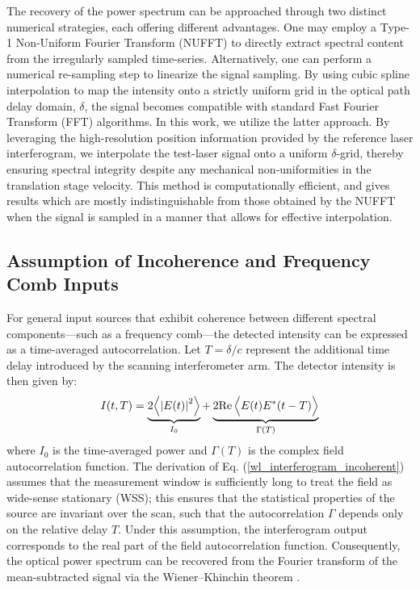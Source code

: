 \documentclass[12pt]{report}
\begin{document}
	The recovery of the power spectrum can be approached through two distinct numerical strategies, each offering different advantages. One may employ a Type-1 Non-Uniform Fourier Transform (NUFFT) to directly extract spectral content from the irregularly sampled time-series. Alternatively, one can perform a numerical re-sampling step to linearize the signal sampling. By using cubic spline interpolation to map the intensity onto a strictly uniform grid in the optical path delay domain, $\delta$, the signal becomes compatible with standard Fast Fourier Transform (FFT) algorithms. In this work, we utilize the latter approach. By leveraging the high-resolution position information provided by the reference laser interferogram, we interpolate the test-laser signal onto a uniform $\delta$-grid, thereby ensuring spectral integrity despite any mechanical non-uniformities in the translation stage velocity. This method is computationally efficient, and gives results which are mostly indistinguishable from those obtained by the NUFFT when the signal is sampled in a manner that allows for effective interpolation.
	
	\subsection{Assumption of Incoherence and Frequency Comb Inputs}
	
	For general input sources that exhibit coherence between different spectral components—such as a frequency comb—the detected intensity can be expressed as a time-averaged autocorrelation. Let $T = \delta/c$ represent the additional time delay introduced by the scanning interferometer arm. The detector intensity is then given by:
	\begin{equation}
		I(t, T) = \underbrace{2\Bigl<  \left|E(t)\right|^2 \Bigr>}_{I_0} + \underbrace{2 \mathrm{Re}\,\Bigl< E(t) E^*(t-T) \Bigr>}_{\Gamma(T)}
	\end{equation}
	where $I_0$ is the time-averaged power and $\Gamma(T)$ is the complex field autocorrelation function. The derivation of Eq. (\ref{wl_interferogram_incoherent}) assumes that the measurement window is sufficiently long to treat the field as wide-sense stationary (WSS); this ensures that the statistical properties of the source are invariant over the scan, such that the autocorrelation $\Gamma$ depends only on the relative delay $T$. Under this assumption, the interferogram output corresponds to the real part of the field autocorrelation function. Consequently, the optical power spectrum can be recovered from the Fourier transform of the mean-subtracted signal via the Wiener–Khinchin theorem \cite{book_born_and_wolf_princpOptics}.
	
\end{document}
